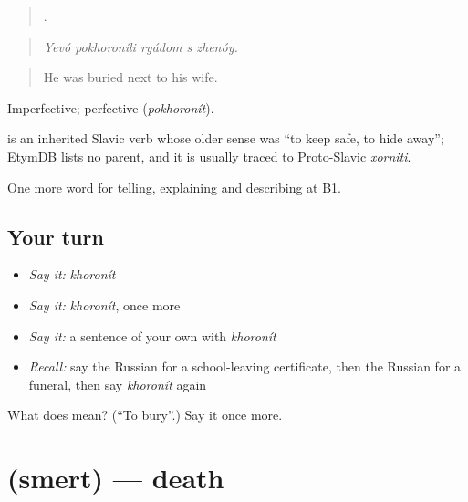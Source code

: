\begin{quote}
    .
\end{quote}

\begin{quote}
\emph{Yevó pokhoroníli ryádom s zhenóy.}
\end{quote}

\begin{quote}
He was buried next to his wife.
\end{quote}

Imperfective; perfective \emph{} (\emph{pokhoronít}).

\begin{cousinweb}
\emph{} is an inherited Slavic verb whose older sense was \textquotedblleft{}to keep safe, to hide away\textquotedblright{}; EtymDB lists no parent, and it is usually traced to Proto-Slavic \emph{xorniti}.
\end{cousinweb}

\begin{grammarlens}[title={What you've built}]
One more word for telling, explaining and describing at B1.
\end{grammarlens}

\subsection*{Your turn}
\begin{itemize}
\raggedright
  \item \emph{Say it:} \emph{khoronít}
  \item \emph{Say it:} \emph{khoronít}, once more
  \item \emph{Say it:} a sentence of your own with \emph{khoronít}
  \item \emph{Recall:} say the Russian for a school-leaving certificate, then the Russian for a funeral, then say \emph{khoronít} again
\end{itemize}

\begin{tcolorbox}[breakable,colback=teal!4,colframe=teal!35!black,title={Before you move on}]
What does  mean? (\textquotedblleft{}To bury\textquotedblright{}.) Say it once more.
\end{tcolorbox}
\section[\texorpdfstring{\ru{смерть} (smert)}{смерть (smert)}]{ (smert) — death}


